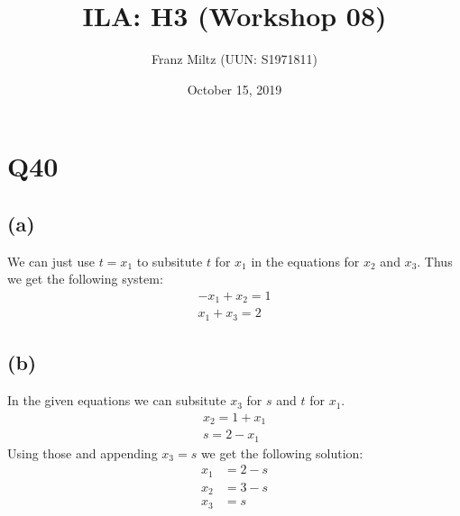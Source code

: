 \documentclass{article}
\title{ILA: H3 (Workshop 08)}
\author{Franz Miltz (UUN: S1971811)}
\date{October 15, 2019}
\begin{document}
\maketitle
\section*{Q40}
\subsection*{(a)}
We can just use $t=x_1$ to subsitute $t$ for $x_1$ in the equations for $x_2$ and $x_3$. Thus we get the following system:
\begin{align*}
	-x_1+x_2=1 \\
	x_1+x_3=2
\end{align*}
\subsection*{(b)}
In the given equations we can subsitute $x_3$ for $s$ and $t$ for $x_1$.
\begin{align*}
	x_2 = 1 + x_1 \\
	s = 2 - x_1
\end{align*}
Using those and appending $x_3=s$ we get the following solution:
\begin{align*}
	x_1 & = 2-s \\
	x_2 & = 3-s \\
	x_3 & = s
\end{align*}
\end{document}
